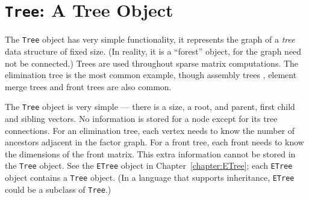 \chapter{{\tt Tree}: A Tree Object}
\par
The {\tt Tree} object has very simple functionality, it represents
the graph of a {\it tree} data structure of fixed size.
(In reality, it is a ``forest'' object, for the graph need not be
connected.)
Trees are used throughout sparse matrix computations.
The elimination tree \cite{liu90-etree} is the most common example,
though assembly trees \cite{duf83-multifrontal}, element merge trees
\cite{eis76-elementModel} and front trees are also common.
\par
The {\tt Tree} object is very simple --- there is a size, a root,
and parent, first child and sibling vectors.
No information is stored for a node except for its tree
connections.
For an elimination tree, each vertex needs to know the number of
ancestors adjacent in the factor graph.
For a front tree, each front needs to know the dimensions of the
front matrix.
This extra information cannot be stored in the {\tt Tree} object.
See the {\tt ETree} object in Chapter~\ref{chapter:ETree}; each
{\tt ETree} object contains a {\tt Tree} object.
(In a language that supports inheritance, {\tt ETree} could be a
subclass of {\tt Tree}.)
\par
